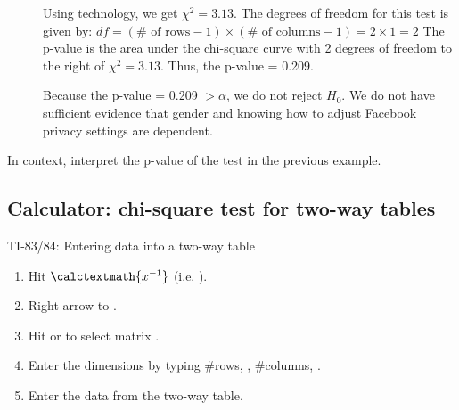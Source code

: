 \begin{examplewrap}
\begin{nexample}
\begin{description}
\item[]  Using technology, we get $\chi^2 = 3.13$.  The degrees of freedom for this test is given by: $df = (\# \text{ of rows} - 1) \times (\# \text{ of columns} - 1) = 2\times 1 = 2$
\newline  The p-value is the area under the chi-square curve with 2 degrees of freedom to the right of $\chi^2=3.13$.  Thus, the p-value = 0.209.
\item[]  Because the p-value = 0.209 $ > \alpha$, we do not reject $H_0$. We do not have sufficient evidence that gender and knowing how to adjust Facebook privacy settings are dependent.
\end{description}
\end{nexample}
\end{examplewrap}

\begin{exercisewrap}
\begin{nexercise}
In context, interpret the p-value of the test in the previous example.\footnotemark
\end{nexercise}
\end{exercisewrap}

\subsection{Calculator: chi-square test for two-way tables}
\label{calcchisq2way}

\begin{onebox}{ TI-83/84: Entering data into a two-way table}
\label{2waytable}
\begin{enumerate}
\setlength{\itemsep}{0mm}
\item Hit  $\calctextmath{x^{-1}}$ (i.e. ).
\item Right arrow to .
\item Hit  or  to select matrix .
\item Enter the dimensions by typing \#rows, , \#columns, .
\item Enter the data from the two-way table.
\end{enumerate}
\end{onebox}

